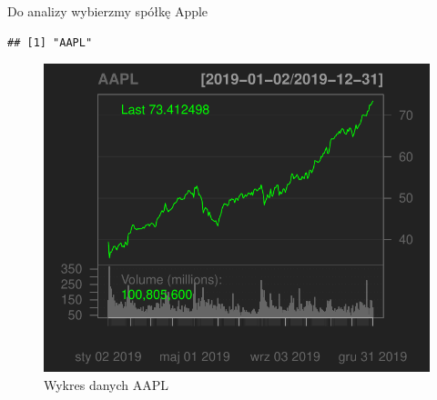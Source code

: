 \documentclass[12pt, a4paper]{article}\usepackage[]{graphicx}\usepackage[]{color}
\makeatletter
\def\maxwidth{ %
  \ifdim\Gin@nat@width>\linewidth
    \linewidth
  \else
    \Gin@nat@width
  \fi
}
\newenvironment{kframe}{%
 \def\at@end@of@kframe{}%
 \ifinner\ifhmode%
  \def\at@end@of@kframe{\end{minipage}}%
  \begin{minipage}{\columnwidth}%
 \fi\fi%
 \def\FrameCommand##1{\hskip\@totalleftmargin \hskip-\fboxsep
 \colorbox{shadecolor}{##1}\hskip-\fboxsep
     \hskip-\linewidth \hskip-\@totalleftmargin \hskip\columnwidth}%
 \MakeFramed {\advance\hsize-\width
   \@totalleftmargin\z@ \linewidth\hsize
   \@setminipage}}%
 {\par\unskip\endMakeFramed%
 \at@end@of@kframe}
\newenvironment{knitrout}{}{} %
\makeatother
\begin{document}
Do analizy wybierzmy spółkę Apple

\begin{knitrout}
\color{fgcolor}\begin{kframe}
\begin{verbatim}
## [1] "AAPL"
\end{verbatim}
\end{kframe}\begin{figure}[H]

{\centering \includegraphics[width=\maxwidth]{figure/unnamed-chunk-1-1} 

}

\caption[Wykres danych AAPL]{Wykres danych AAPL}\label{fig:unnamed-chunk-1}
\end{figure}

\end{knitrout}
\end{document}
